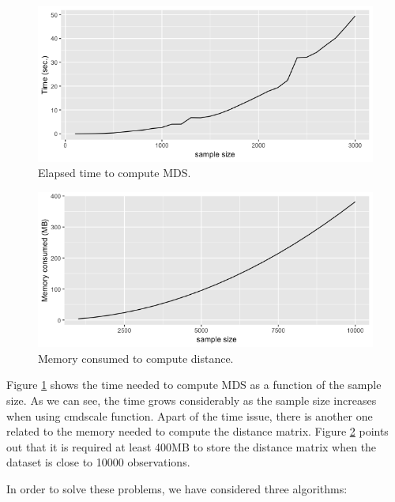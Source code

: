 \documentclass[11pt]{report}
\begin{document}
 
\begin{figure}[ht]
\centering
    \includegraphics[scale = 0.5]{./images/elapsed_time_mds.png}
    \caption{Elapsed time to compute MDS.}
    \label{elapsed_time_mds}
\end{figure}



\begin{figure}[ht]
\centering
\includegraphics[scale = 0.5]{./images/memory_distance.png}
\caption{Memory consumed to compute distance.}
\label{memory_distance}
\end{figure}


\indent Figure \ref{elapsed_time_mds} shows the time needed to compute MDS
as a function of the sample size. As we can see, the time grows 
considerably as the sample size increases when using \textsf{cmdscale} function. 
Apart of the time issue, there is another one related to the memory needed to 
compute the distance matrix. Figure \ref{memory_distance} points out 
that it is required at least 400MB to store the distance matrix when the 
dataset is close to 10000 observations.

\indent In order to solve these problems, we have considered three algorithms:
\end{document}
